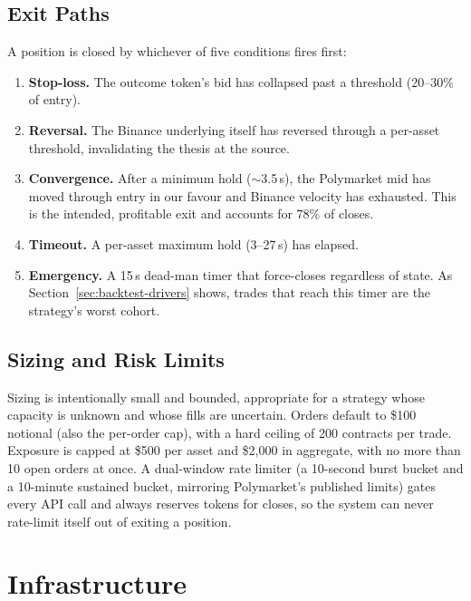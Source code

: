 \documentclass{tmsce}
\let\oldsection\section
\renewcommand{\section}{\clearpage\oldsection}
\begin{document}
\subsection{Exit Paths}

A position is closed by whichever of five conditions fires first:

\begin{enumerate}
  \item \textbf{Stop-loss.} The outcome token's bid has collapsed past a threshold
        (20--30\% of entry).
  \item \textbf{Reversal.} The Binance underlying itself has reversed through a
        per-asset threshold, invalidating the thesis at the source.
  \item \textbf{Convergence.} After a minimum hold ($\sim$3.5\,s), the Polymarket mid
        has moved through entry in our favour and Binance velocity has exhausted.
        This is the intended, profitable exit and accounts for $78\%$ of closes.
  \item \textbf{Timeout.} A per-asset maximum hold (3--27\,s) has elapsed.
  \item \textbf{Emergency.} A 15\,s dead-man timer that force-closes regardless of
        state. As Section~\ref{sec:backtest-drivers} shows, trades that reach this
        timer are the strategy's worst cohort.
\end{enumerate}

\subsection{Sizing and Risk Limits}

Sizing is intentionally small and bounded, appropriate for a strategy whose capacity
is unknown and whose fills are uncertain. Orders default to \$100 notional (also the
per-order cap), with a hard ceiling of 200 contracts per trade. Exposure is capped
at \$500 per asset and \$2{,}000 in aggregate, with no more than 10 open orders at
once. A dual-window rate limiter (a 10-second burst bucket and a 10-minute sustained
bucket, mirroring Polymarket's published limits) gates every API call and always
reserves tokens for closes, so the system can never rate-limit itself out of exiting
a position.


\section{Infrastructure}
\label{sec:infra}
\end{document}

